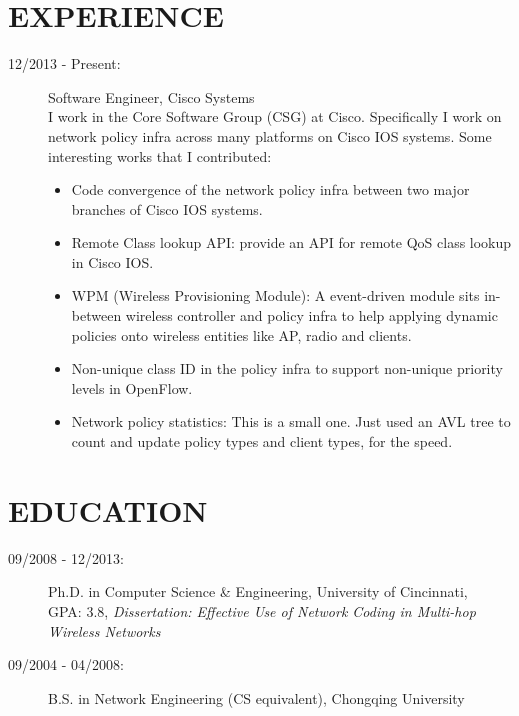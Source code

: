 \documentclass[line]{res}
\begin{document}
\address{36681 Bishop St\\ Newark, CA 94560 \\ 513-679-0772}
\address{Email: \href{mailto:yang@yangchi.me}{yang@yangchi.me} \\ Github: \url{https://github.com/yangchi} }

\begin{resume}
	\section{EXPERIENCE}
	\begin{description}
		\item[12/2013 - Present:] Software Engineer, Cisco Systems \\
		I work in the Core Software Group (CSG) at Cisco. Specifically I work on network policy infra across many platforms on Cisco IOS systems. Some interesting works that I contributed:
            \begin{itemize}
            \item Code convergence of the network policy infra between two major branches of Cisco IOS systems.
			\item Remote Class lookup API: provide an API for remote QoS class lookup in Cisco IOS.
            \item WPM (Wireless Provisioning Module): A event-driven module sits in-between wireless controller and policy infra to help applying dynamic policies onto wireless entities like AP, radio and clients.
            \item Non-unique class ID in the policy infra to support non-unique priority levels in OpenFlow.
            \item Network policy statistics: This is a small one. Just used an AVL tree to count and update policy types and client types, for the speed.
            \end{itemize}
	\end{description}
	\section{EDUCATION}
	\begin{description}
		\item[09/2008 - 12/2013:] Ph.D. in Computer Science \& Engineering, University of Cincinnati, \\
			GPA: 3.8, \emph{Dissertation: Effective Use of Network Coding in Multi-hop Wireless Networks}
		\item[09/2004 - 04/2008:] B.S. in Network Engineering (CS equivalent), Chongqing University
	\end{description}
	

\end{resume}
\end{document}

